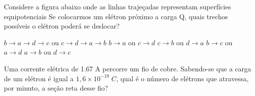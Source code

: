 \documentclass[12pt, addpoints]{exam}
\begin{document}
    \begin{questions}
\begin{multicols*}{2}
\question Considere a figura abaixo onde as linhas trajeçadas representam superfícies equipotenciais Se colocarmos um elétron próximo a carga Q, quais trechos possíveis o elétron poderá se deslocar?
        
        \begin{center}
            \begin{minipage}[c]{0.5\linewidth}
            \end{minipage}
        \end{center}
        
        

\begin{choices}
\choice $b\rightarrow a\rightarrow d\rightarrow c$ ou $c\rightarrow d\rightarrow a\rightarrow b$ 
\choice $b\rightarrow a$ ou $c\rightarrow d$ 
\choice $c\rightarrow b$ ou $d\rightarrow a$ 
\choice $b\rightarrow c$ ou $a\rightarrow d$ 
\choice $a\rightarrow b$ ou $d\rightarrow c$ 
\end{choices}
\question Uma corrente elétrica de    1.67 A percorre um ﬁo de cobre. Sabendo-se que a carga de um elétron é igual a $1,6\times 10^{-19}\;C$, qual é o número de elétrons que atravessa, por minuto, a seção reta desse ﬁo?


\end{multicols*}
\end{questions}
\end{document}
